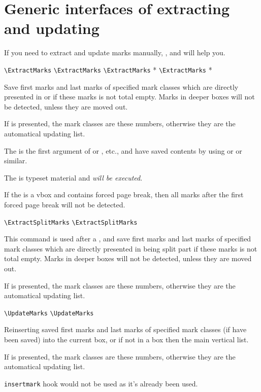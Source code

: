 \documentclass{l3doc}
\begin{document}
\section{Generic interfaces of extracting and updating}

If you need to extract and update marks manually, , 
 and  will help you.

\begin{function}{\ExtractMarks}
  \begin{syntax}
    \verb|\ExtractMarks| 
    \verb|\ExtractMarks|  
    \verb|\ExtractMarks| * 
    \verb|\ExtractMarks| *  
  \end{syntax}
Save first marks and last marks of specified mark classes
which are directly presented in  or  
if these marks is not total empty. 
Marks in deeper boxes will not be detected, unless they are moved out.

If  is presented, the mark classes are these numbers, otherwise
they are the automatical updating list.

The  is the first argument of  or , etc.,
and have saved contents by using  or  or similar.

The  is typeset material and \emph{will be executed}.

If the  is a vbox and contains forced page break, then all marks after 
the first forced page break will not be detected.
\end{function}

\begin{function}{\ExtractSplitMarks}
  \begin{syntax}
    \verb|\ExtractSplitMarks|
    \verb|\ExtractSplitMarks| 
  \end{syntax}
This command is used after a , and save 
first marks and last marks of specified mark classes which are directly
presented in being split part if these marks is not total empty. 
Marks in deeper boxes will not be detected, unless they are moved out.

If  is presented, the mark classes are these numbers, otherwise
they are the automatical updating list.
\end{function}

\begin{function}{\UpdateMarks}
  \begin{syntax}
    \verb|\UpdateMarks|
    \verb|\UpdateMarks| 
  \end{syntax}
Reinserting saved first marks and last marks of specified mark classes 
(if have been saved) into the current box, 
or if not in a box then the main vertical list.

If  is presented, the mark classes are these numbers, otherwise
they are the automatical updating list.

\texttt{insertmark} hook would not be used as it's already been used.
\end{function}
\end{document}
